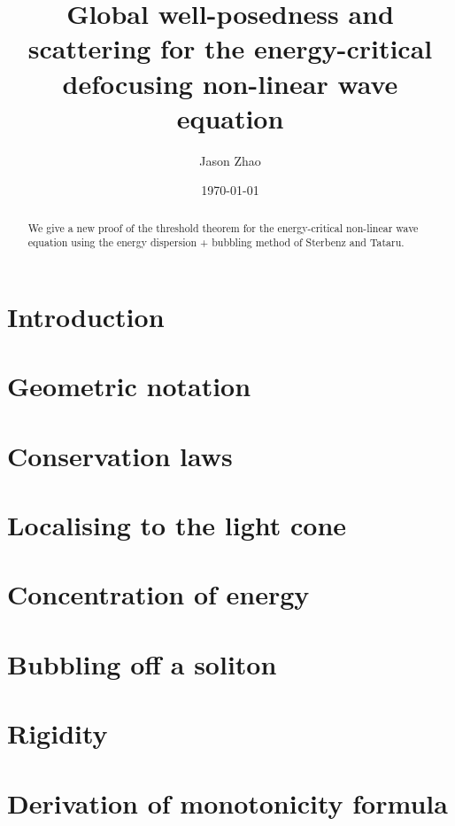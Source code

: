 \documentclass[reqno]{amsart}
\title
{
	Global well-posedness and scattering for the energy-critical defocusing non-linear wave equation
}
\author{Jason Zhao}
\date{\today}
\begin{document}
\maketitle

\begin{abstract}
	We give a new proof of the threshold theorem for the energy-critical non-linear wave equation using the energy dispersion + bubbling method of Sterbenz and Tataru.
\end{abstract}

\tableofcontents

\section{Introduction}


\section{Geometric notation}


\section{Conservation laws}


\section{Localising to the light cone}\label{sec:local}


\section{Concentration of energy}\label{sec:ED}


\section{Bubbling off a soliton}


\section{Rigidity}


\appendix
\section{Derivation of monotonicity formula}\label{app:A}




\end{document}
